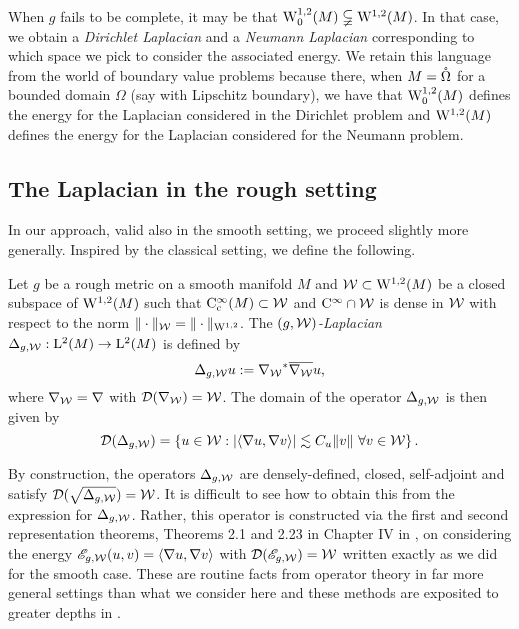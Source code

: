 \documentclass[a4paper, 12pt]{amsart}
\begin{document}
When $g$ fails to be complete, it may be that  
$\SobH[0]{1}(M) \subsetneqq  \SobH{1}(M)$.
In that case, we obtain a \emph{Dirichlet Laplacian} and  a \emph{Neumann 
Laplacian} corresponding to which space we pick 
to consider the associated energy.
We retain this language from the world of boundary 
value problems because there, when $M = \interior\Omega$
for a bounded domain $\Omega$ (say with Lipschitz boundary), we have that
$\SobH[0]{1}(M)$ defines the energy for
the Laplacian considered in the Dirichlet problem
and $\SobH{1}(M)$ defines the energy 
for the Laplacian considered for the Neumann problem.

\subsection{The Laplacian in the rough setting}

In our approach, valid also in the smooth setting, we proceed slightly more generally. Inspired by the classical setting, we define
the following.
 
\begin{defn}[$(g,\cW)$-Laplacian]
Let \(g\) be a rough metric on a smooth manifold \(M\)
and $\cW \subset \SobH{1}(M)$ be a closed subspace
of $\SobH{1}(M)$ such that $\Ck[c]{\infty}(M) \subset \cW$
and $\Ck{\infty} \cap \cW$ is dense in $\cW$ with respect to the norm $\norm{\cdot}_{\cW} = \norm{\cdot}_{\SobH{1}}$. The \emph{$(g,\cW)$-Laplacian}
\(\Delta_{g,\cW} : \Lp{2}(M) \to \Lp{2}(M)\) is defined by
\[
\Delta_{g,\cW} u := \adj{\nabla_{\cW}} \close{ \nabla_{\cW}} u,
\]
where  $\nabla_{\cW} = \nabla$ with $\dom(\nabla_{\cW}) = \cW$. 
The domain of the operator $\Delta_{g,\cW}$ is then given by
$$\dom(\Delta_{g,\cW}) = \set{u \in \cW: \modulus{\inprod{\nabla u, \nabla v}} \lesssim C_u \norm{v}\ \forall v \in \cW}.$$
\end{defn}

By construction, the  operators $\Delta_{g,\cW}$ 
are densely-defined, closed, self-adjoint and satisfy 
$\dom(\sqrt{\Delta_{g,\cW}}) = \cW$.
It is difficult to see how to obtain this from the expression for $\Delta_{g,\cW}$.
Rather, this operator is constructed via the first and second representation 
theorems, Theorems 2.1 and 2.23 in Chapter IV in \cite{Kato}, on considering the   
energy $\sE_{g,\cW}(u,v) = \inprod{\nabla u, \nabla v}$ 
with $\dom(\sE_{g,\cW}) = \cW$ written exactly as we did for the smooth case.
These are routine facts from operator theory in far more general 
settings than what we consider here and these methods are exposited to 
greater depths in \cite{Yosida, Kato}.
 
\end{document}
